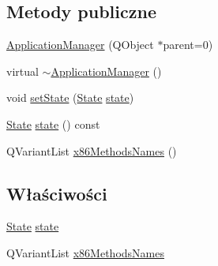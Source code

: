 \subsection*{Metody publiczne}
\begin{DoxyCompactItemize}
\item 
\hyperlink{class_application_manager_a879feb4ed324b2f0c381e2cf377fe56d}{Application\-Manager} (Q\-Object $\ast$parent=0)
\item 
virtual \hyperlink{class_application_manager_a05a04d6e3834adf031606133bbee313d}{$\sim$\-Application\-Manager} ()
\item 
void \hyperlink{class_application_manager_a9923f3e608544e9e74d604a6018c9ae1}{set\-State} (\hyperlink{class_application_manager_aeb5af7a2aa47623af5160ea1f20d0243}{State} \hyperlink{class_application_manager_a930a84127f404aa07e142c5b37dfe128}{state})
\item 
\hyperlink{class_application_manager_aeb5af7a2aa47623af5160ea1f20d0243}{State} \hyperlink{class_application_manager_aa86515d8c95bae5d713033e75becdf3c}{state} () const 
\item 
Q\-Variant\-List \hyperlink{class_application_manager_a793af100a8c392337bb94fc1f81c4d9a}{x86\-Methods\-Names} ()
\end{DoxyCompactItemize}
\subsection*{Właściwości}
\begin{DoxyCompactItemize}
\item 
\hyperlink{class_application_manager_aeb5af7a2aa47623af5160ea1f20d0243}{State} \hyperlink{class_application_manager_a930a84127f404aa07e142c5b37dfe128}{state}
\item 
Q\-Variant\-List \hyperlink{class_application_manager_a04d639af3af2e31840e42bfe72f99a0c}{x86\-Methods\-Names}
\end{DoxyCompactItemize}
